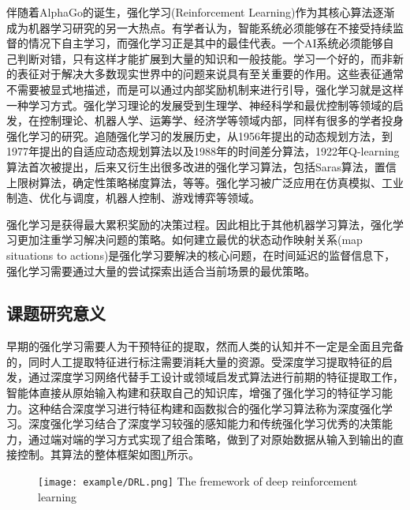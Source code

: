 伴随着AlphaGo的诞生，强化学习(Reinforcement Learning)作为其核心算法逐渐成为机器学习研究的另一大热点。有学者认为，智能系统必须能够在不接受持续监督的情况下自主学习，而强化学习正是其中的最佳代表。一个AI系统必须能够自己判断对错，只有这样才能扩展到大量的知识和一般技能。学习一个好的，而非新的表征对于解决大多数现实世界中的问题来说具有至关重要的作用。这些表征通常不需要被显式地描述，而是可以通过内部奖励机制来进行引导，强化学习就是这样一种学习方式。强化学习理论的发展受到生理学、神经科学和最优控制等领域的启发，在控制理论、机器人学、运筹学、经济学等领域内部，同样有很多的学者投身强化学习的研究。追随强化学习的发展历史，从1956年提出的动态规划方法，到1977年提出的自适应动态规划算法以及1988年的时间差分算法，1922年Q-learning算法首次被提出，后来又衍生出很多改进的强化学习算法，包括Saras算法，置信上限树算法，确定性策略梯度算法，等等。强化学习被广泛应用在仿真模拟\cite{傅启明2014一种基于线性函数逼近的离策略}、工业制造\cite{高阳2007平均奖赏强化学习算法研究}、优化与调度\cite{魏英姿2005一种基于强化学习的作业车间动态调度方法}，机器人控制\cite{Ipek2008Self}、游戏博弈\cite{Tesauro1944TD}等领域。

强化学习是获得最大累积奖励的决策过程。因此相比于其他机器学习算法，强化学习更加注重学习解决问题的策略。如何建立最优的状态动作映射关系(map situations to actions)是强化学习要解决的核心问题，在时间延迟的监督信息下，强化学习需要通过大量的尝试探索出适合当前场景的最优策略。

\subsection{课题研究意义}
早期的强化学习需要人为干预特征的提取，然而人类的认知并不一定是全面且完备的，同时人工提取特征进行标注需要消耗大量的资源。受深度学习提取特征的启发，通过深度学习网络代替手工设计或领域启发式算法进行前期的特征提取工作，智能体直接从原始输入构建和获取自己的知识库，增强了强化学习的特征学习能力。这种结合深度学习进行特征构建和函数拟合的强化学习算法称为深度强化学习。深度强化学习结合了深度学习较强的感知能力和传统强化学习优秀的决策能力，通过端对端的学习方式实现了组合策略，做到了对原始数据从输入到输出的直接控制。其算法的整体框架如图\ref{fig:DRL}所示。
\begin{figure}[htbp]
	\centering
	\texttt{[image: example/DRL.png]}
	{The fremework of deep reinforcement learning}
	\label{fig:DRL}
\end{figure}

